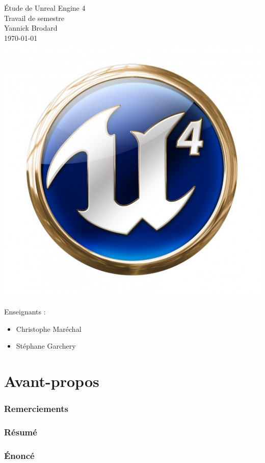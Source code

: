 \documentclass[11pt, a4paper, oneside]{article}
\begin{document}
\begin{center}
{\Huge{Étude de Unreal Engine 4}} \\[0.5cm]
{\LARGE{Travail de semestre}}\\[0.5cm]
{\Large{Yannick Brodard}}\\[0.3cm]
\today\\
\includegraphics[scale=0.4]{UE4_logo}
\end{center}
Enseignants :
\begin{itemize}
\item Christophe Maréchal
\item Stéphane Garchery
\end{itemize}
\thispagestyle{empty}
\newpage
\tableofcontents
\part{Avant-propos}
\section{Remerciements}
\section{Résumé}
\section{Énoncé}
\end{document}
